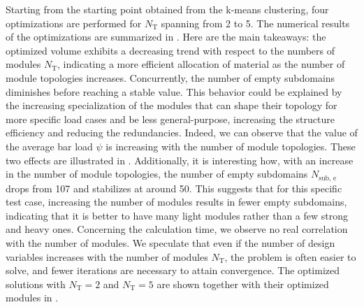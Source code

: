 Starting from the starting point obtained from the k-means clustering, four optimizations are performed for $N_\text{T}$ spanning from 2 to 5. The numerical results of the optimizations are summarized in . Here are the main takeaways: the optimized volume exhibits a decreasing trend with respect to the numbers of modules $N_\text{T}$, indicating a more efficient allocation of material as the number of module topologies increases. Concurrently, the number of empty subdomains diminishes before reaching a stable value. This behavior could be explained by the increasing specialization of the modules that can shape their topology for more specific load cases and be less general-purpose, increasing the structure efficiency and reducing the redundancies. Indeed, we can observe that the value of the average bar load $\psi$ is increasing with the number of module topologies. These two effects are illustrated in . Additionally, it is interesting how, with an increase in the number of module topologies, the number of empty subdomains $N_\text{sub, e}$ drops from 107 and stabilizes at around 50. This suggests that for this specific test case, increasing the number of modules results in fewer empty subdomains, indicating that it is better to have many light modules rather than a few strong and heavy ones. Concerning the calculation time, we observe no real correlation with the number of modules. We speculate that even if the number of design variables increases with the number of modules $N_\text{T}$, the problem is often easier to solve, and fewer iterations are necessary to attain convergence. The optimized solutions with $N_\text{T}=2$ and $N_\text{T}=5$ are shown together with their optimized modules in . 

